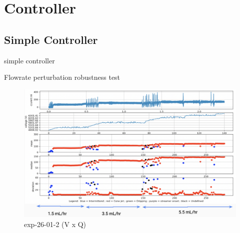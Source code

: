 \section{Controller}
\label{sec:controller_results}


    \subsection{Simple Controller}

        \begin{algorithm}
            \caption{simple controller}\label{alg:simple_controller}
            \begin{algorithmic}
                
                    \State {}
                    \State {}
                \EndIf

            \EndFunction
            \end{algorithmic}
        \end{algorithm}

        Flowrate perturbation robustness test

        \begin{figure}[H]
            \center
            \includegraphics[width=15cm]{Figuras/19:03/control_first_results.png}
            \caption{ exp-26-01-2 (V x Q)}
        \end{figure}



